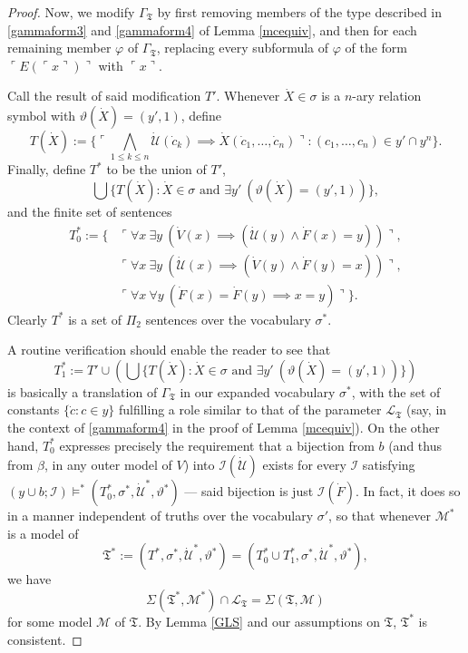 \documentclass[12pt]{article}
\numberwithin{equation}{section}
\begin{document}
\begin{proof}
Now, we modify $\Gamma_{\mathfrak{T}}$ by first removing members of the type described in \ref{gammaform3} and \ref{gammaform4} of Lemma \ref{mcequiv}, and then for each remaining member $\varphi$ of $\Gamma_{\mathfrak{T}}$, replacing every subformula of $\varphi$ of the form $\ulcorner E(\ulcorner x \urcorner) \urcorner$ with $\ulcorner x \urcorner$. 

Call the result of said modification $T'$. Whenever $\dot{X} \in \sigma$ is a $n$-ary relation symbol with $\vartheta(\dot{X}) = (y', 1)$, define $$T(\dot{X}) := \{\ulcorner \bigwedge_{1 \leq k \leq n} \dot{\mathcal{U}}(\dot{c}_k) \implies \dot{X}(\dot{c}_1, \dots, \dot{c}_n) \urcorner : (c_1, \dots, c_n) \in y' \cap y^n\}.$$ Finally, define $T^*$ to be the union of $T'$, $$\bigcup \{T(\dot{X}) : \dot{X} \in \sigma \text{ and } \exists y' \ (\vartheta(\dot{X}) = (y', 1))\},$$ and the finite set of sentences
\begin{align*}
    T^*_0 := \{ & \ulcorner \forall x \ \exists y \ (\dot{V}(x) \implies (\dot{\mathcal{U}}(y) \wedge \dot{F}(x) = y)) \urcorner, \\
    & \ulcorner \forall x \ \exists y \ (\dot{\mathcal{U}}(x) \implies (\dot{V}(y) \wedge \dot{F}(y) = x)) \urcorner, \\
    & \ulcorner \forall x \ \forall y \ (\dot{F}(x) = \dot{F}(y) \implies x = y) \urcorner\} \text{.}
\end{align*}
Clearly $T^*$ is a set of $\Pi_2$ sentences over the vocabulary $\sigma^*$.

A routine verification should enable the reader to see that $$T^*_1 := T' \cup (\bigcup \{T(\dot{X}) : \dot{X} \in \sigma \text{ and } \exists y' \ (\vartheta(\dot{X}) = (y', 1))\})$$ is basically a translation of $\Gamma_{\mathfrak{T}}$ in our expanded vocabulary $\sigma^*$, with the set of constants $\{\dot{c} : c \in y\}$ fulfilling a role similar to that of the parameter $\mathcal{L}_{\mathfrak{T}}$ (say, in the context of \ref{gammaform4} in the proof of Lemma \ref{mcequiv}). On the other hand, $T^*_0$ expresses precisely the requirement that a bijection from $b$ (and thus from $\beta$, in any outer model of $V$) into $\mathcal{I}(\dot{\mathcal{U}})$ exists for every $\mathcal{I}$ satisfying $(y \cup b; \mathcal{I}) \models^* (T^*_0, \sigma^*,  \dot{\mathcal{U}}^*, \vartheta^*)$ --- said bijection is just $\mathcal{I}(\dot{F})$. In fact, it does so in a manner independent of truths over the vocabulary $\sigma'$, so that whenever $\mathcal{M}^*$ is a model of $$\mathfrak{T}^* := (T^*, \sigma^*, \dot{\mathcal{U}}^*, \vartheta^*) = (T^*_0 \cup T^*_1, \sigma^*,  \dot{\mathcal{U}}^*, \vartheta^*),$$ we have $$\Sigma(\mathfrak{T}^*, \mathcal{M}^*) \cap \mathcal{L}_{\mathfrak{T}} = \Sigma(\mathfrak{T}, \mathcal{M})$$ for some model $\mathcal{M}$ of $\mathfrak{T}$. By Lemma \ref{GLS} and our assumptions on $\mathfrak{T}$, $\mathfrak{T}^*$ is consistent. 


\end{proof}
\end{document}
